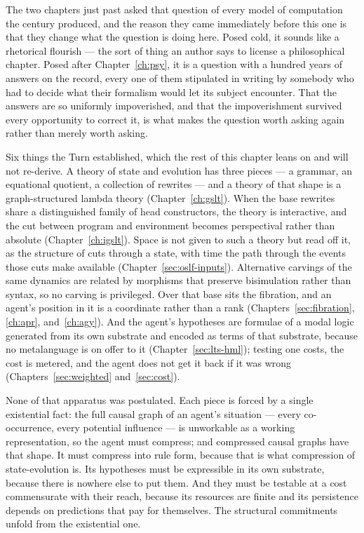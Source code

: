 The two chapters just past asked that question of every model of
computation the century produced, and the reason they came
immediately before this one is that they change what the question
is doing here.
Posed cold, it sounds like a rhetorical flourish --- the sort of
thing an author says to license a philosophical chapter.
Posed after Chapter~\ref{ch:psy}, it is a question with a hundred
years of answers on the record, every one of them stipulated in
writing by somebody who had to decide what their formalism would
let its subject encounter.
That the answers are so uniformly impoverished, and that the
impoverishment survived every opportunity to correct it, is what
makes the question worth asking again rather than merely worth
asking.

Six things the Turn established, which the rest of this chapter
leans on and will not re-derive.
A theory of state and evolution has three pieces --- a grammar, an
equational quotient, a collection of rewrites --- and a theory of
that shape is a graph-structured lambda theory
(Chapter~\ref{ch:gslt}).
When the base rewrites share a distinguished family of head
constructors, the theory is interactive, and the cut between
program and environment becomes perspectival rather than absolute
(Chapter~\ref{ch:igslt}).
Space is not given to such a theory but read off it, as the
structure of cuts through a state, with time the path through the
events those cuts make available (Chapter~\ref{sec:oslf-inputs}).
Alternative carvings of the same dynamics are related by morphisms
that preserve bisimulation rather than syntax, so no carving is
privileged.
Over that base sits the fibration, and an agent's position in it is
a coordinate rather than a rank
(Chapters~\ref{sec:fibration}, \ref{ch:apr}, and~\ref{ch:agy}).
And the agent's hypotheses are formulae of a modal logic generated
from its own substrate and encoded as terms of that substrate,
because no metalanguage is on offer to it
(Chapter~\ref{sec:lts-hml}); testing one costs, the cost is
metered, and the agent does not get it back if it was wrong
(Chapters~\ref{sec:weighted} and~\ref{sec:cost}).

None of that apparatus was postulated.
Each piece is forced by a single existential fact: the full causal
graph of an agent's situation --- every co-occurrence, every
potential influence --- is unworkable as a working representation,
so the agent must compress; and compressed causal graphs have that
shape.
It must compress into rule form, because that is what compression
of state-evolution is.
Its hypotheses must be expressible in its own substrate, because
there is nowhere else to put them.
And they must be testable at a cost commensurate with their reach,
because its resources are finite and its persistence depends on
predictions that pay for themselves.
The structural commitments unfold from the existential one.

